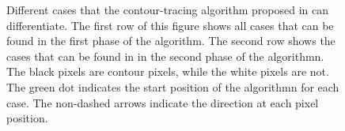 \documentclass[thesis.tex]{subfiles}
\begin{document}
\begin{figure}

\caption{Different cases that the contour-tracing algorithm proposed in \cite{seo2016fast} can differentiate. The first row of this figure shows all cases that can be found in the first phase of the algorithm. The second row shows the cases that can be found in in the second phase of the algorithmn. The black pixels are contour pixels, while the white pixels are not. The green dot indicates the start position of the algorithmn for each case. The non-dashed arrows indicate the direction at each pixel position.}
 \label{fig:contour_phase}
\end{figure}

\end{document}
